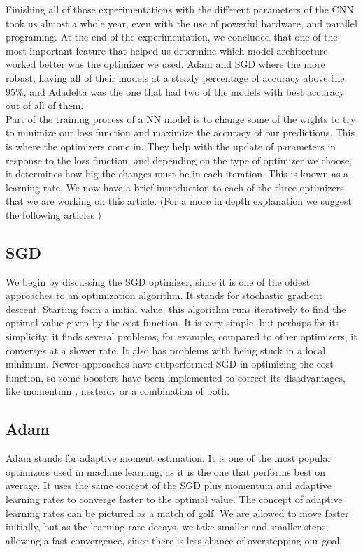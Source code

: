 \documentclass[review]{elsarticle}
\begin{document}
Finishing all of those experimentations with the different parameters of the CNN took us almost a whole year, even with the use of powerful hardware, and parallel programing. At the end of the experimentation, we concluded that one of the most important feature that helped us determine which model architecture worked better was the optimizer we used. Adam and SGD where the more robust, having all of their models at a steady percentage of accuracy above the 95\%, and Adadelta was the one that had two of the models with best accuracy out of all of them.\\

Part of the training process of a NN model is to change some of the wights to try to minimize our loss function and maximize the accuracy of our predictions. This is where the optimizers come in. They help with the update of parameters in response to the loss function, and depending on the type of optimizer we choose, it determines how big the changes must be in each iteration. This is known as a learning rate. We now have a brief introduction to each of the three optimizers that we are working on this article. (For a more in depth explanation we suggest the following articles \cite{adam} \cite{adadelta} \cite{sgd}) \\

\subsection{SGD}
We begin by discussing the SGD optimizer, since it is one of the oldest approaches to an optimization algorithm. It stands for stochastic gradient descent.  Starting form a initial value, this algorithm runs iteratively to find the optimal value given by the cost function. It is very simple, but perhaps for its simplicity, it finds several problems, for example, compared to other optimizers, it converges at a slower rate. It also has problems with being stuck in a local minimum. Newer approaches have outperformed SGD in optimizing the cost function, so some boosters have been implemented to correct its disadvantages, like momentum \cite{momentum}, nesterov \cite{nesterov} or a combination of both.\\
\subsection{Adam}

Adam stands for adaptive moment estimation. It is one of the most popular optimizers used in machine learning, as it is the one that performs best on average. It uses the same concept of the SGD plus momentum and adaptive learning rates to converge faster to the optimal value. The concept of adaptive learning rates can be pictured as a match of golf. We are allowed to move faster initially, but as the learning rate decays, we take smaller and smaller steps, allowing a fast convergence, since there is less chance of overstepping our goal.\\
\end{document}
